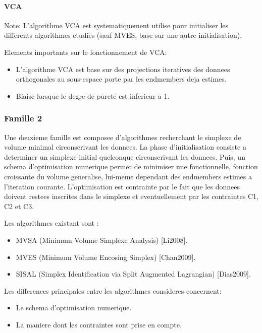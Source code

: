 \paragraph{VCA} 
Note: L'algorithme VCA est systematiquement
utilise pour initialiser les differents algorithmes etudies (sauf
MVES, base sur une autre initialisation).

Elements importants sur le fonctionnement de VCA: 
\begin{itemize}
\item {L'algorithme VCA
est base sur des projections iteratives des donnees orthogonales au
sous-espace porte par les endmembers deja estimes.}
\item {Biaise lorsque le
degre de purete est inferieur a 1.}

\end{itemize}  

\subsubsection{Famille 2} 
Une deuxieme famille est composee d'algorithmes recherchant le
simplexe de volume minimal circonscrivant les donnees. La phase
d'initialisation consiste a determiner un simplexe initial quelconque
circonscrivant les donnees. Puis, un schema d'optimisation numerique
permet de minimiser une fonctionnelle, fonction croissante du volume
generalise, lui-meme dependant des endmembers estimes a l'iteration
courante. L'optimisation est contrainte par le fait que les donnees
doivent restees inscrites dans le simplexe et eventuellement par les
contraintes C1, C2 et C3.

Les algorithmes existant sont : 
\begin{itemize}
\item {MVSA (Minimum Volume Simplexe
Analysis) [Li2008].}
\item { MVES (Minimum Volume Encosing Simplex)
[Chan2009].}
\item {SISAL (Simplex Identification via Split Augmented
Lagrangian) [Dias2009].}
\end{itemize}  
  
Les differences principales entre les algorithmes consideres
concernent: 
\begin{itemize}
\item {Le schema d'optimisation numerique.}
\item {La maniere dont les
contraintes sont prise en compte.}

\end{itemize}  

